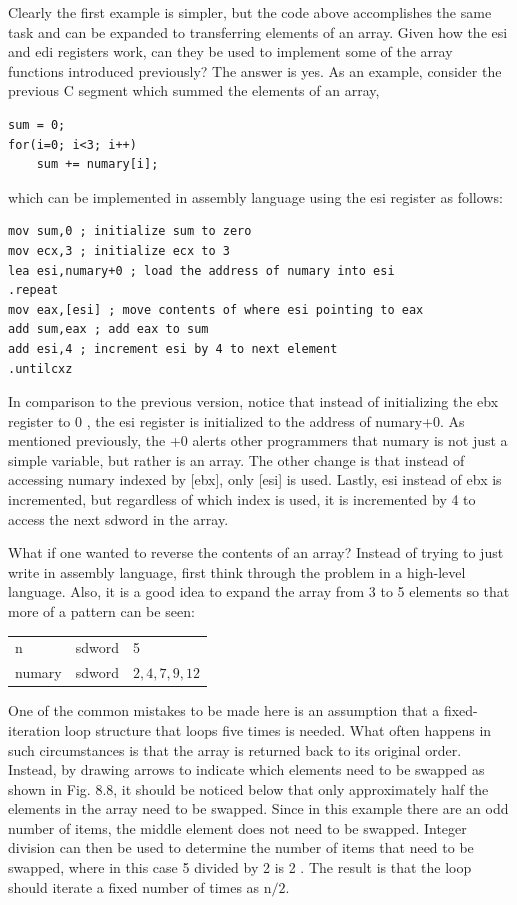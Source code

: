 \documentclass[10pt]{book}
\begin{document}
Clearly the first example is simpler, but the code above accomplishes the same task and can be expanded to transferring elements of an array. Given how the esi and edi registers work, can they be used to implement some of the array functions introduced previously? The answer is yes. As an example, consider the previous C segment which summed the elements of an array,

\begin{verbatim}
sum = 0;
for(i=0; i<3; i++)
    sum += numary[i];
\end{verbatim}

which can be implemented in assembly language using the esi register as follows:

\begin{verbatim}
mov sum,0 ; initialize sum to zero
mov ecx,3 ; initialize ecx to 3
lea esi,numary+0 ; load the address of numary into esi
.repeat
mov eax,[esi] ; move contents of where esi pointing to eax
add sum,eax ; add eax to sum
add esi,4 ; increment esi by 4 to next element
.untilcxz
\end{verbatim}

In comparison to the previous version, notice that instead of initializing the ebx register to 0 , the esi register is initialized to the address of numary+0. As mentioned previously, the +0 alerts other programmers that numary is not just a simple variable, but rather is an array. The other change is that instead of accessing numary indexed by [ebx], only [esi] is used. Lastly, esi instead of ebx is incremented, but regardless of which index is used, it is incremented by 4 to access the next sdword in the array.

What if one wanted to reverse the contents of an array? Instead of trying to just write in assembly language, first think through the problem in a high-level language. Also, it is a good idea to expand the array from 3 to 5 elements so that more of a pattern can be seen:

\begin{center}
\begin{tabular}{lll}
n & sdword & 5 \\
numary & sdword & $2,4,7,9,12$ \\
\end{tabular}
\end{center}

One of the common mistakes to be made here is an assumption that a fixed-iteration loop structure that loops five times is needed. What often happens in such circumstances is that the array is returned back to its original order. Instead, by drawing arrows to indicate which elements need to be swapped as shown in Fig. 8.8, it should be noticed below that only approximately half the elements in the array need to be swapped. Since in this example there are an odd number of items, the middle element does not need to be swapped. Integer division can then be used to determine the number of items that need to be swapped, where in this case 5 divided by 2 is 2 . The result is that the loop should iterate a fixed number of times as $\mathrm{n} / 2$.
\end{document}
